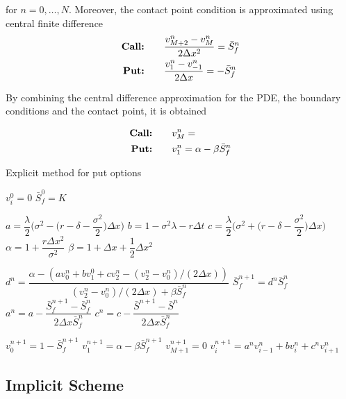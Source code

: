 for $n=0,\dots,N$. Moreover, the contact point condition is approximated using central finite difference
\begin{align*}
    \text{\textbf{Call:}} \qquad & \dfrac{v^{n}_{M+2} - v^{n}_{M}}{2\Delta{x}^2} = \bar{S}^{n}_{f} \\
    \text{\textbf{Put:}} \qquad & \dfrac{v^{n}_{1} - v^{n}_{-1}}{2\Delta{x}}  = -\bar{S}^{n}_{f}  
\end{align*}

By combining the central difference approximation for the PDE, the boundary conditions and the contact point, it is obtained 

\begin{align*}
    \text{\textbf{Call:}} \qquad & v^{n}_{M} =  \\
    \text{\textbf{Put:}} \qquad & v^{n}_{1} = \alpha - \beta\bar{S}^{n}_{f}  
\end{align*}

\begin{algorithm}[H]
    \caption{Explicit method for put options}\label{alg:appendix:companytransformation:explicits:put_explicit_method_algorithm}
    \begin{algorithmic}
      \State $v^{0}_i = 0 $
    \EndFor
    \State $\bar{S}_{f}^{0} = K$

    \State $a = \dfrac{\lambda}{2}\bigg(\sigma^2 - \bigg(r - \delta - \dfrac{\sigma^2}{2}\bigg)\Delta{x}\bigg)$
    \State $b = 1 - \sigma^2\lambda- r\Delta{t} $
    \State $c = \dfrac{\lambda}{2}\bigg(\sigma^2 + \bigg(r - \delta - \dfrac{\sigma^2}{2}\bigg)\Delta{x}\bigg)$
    \State $\alpha = 1 + \dfrac{r\Delta{x}^2}{\sigma^2}$
    \State $\beta = 1 + \Delta{x} + \dfrac{1}{2}\Delta{x}^2$

      \State $d^n = \dfrac{\alpha - (av^{n}_{0} + bv^{0}_{1} + cv^{n}_{2} - (v^{n}_{2} - v^{n}_{0})/(2\Delta{x}))}{(v^{n}_{2} - v^{n}_{0})/(2\Delta{x}) + \beta\bar{S}^{n}_f}$
      \State $\bar{S}^{n+1}_{f}=d^{n}\bar{S}^{n}_{f}$
      \State $a^{n} = a - \dfrac{\bar{S}^{n+1}_{f} - \bar{S}^{n}_{f}}{2\Delta{x}\bar{S}^{n}_{f}}$
      \State $c^{n} = c - \dfrac{\bar{S}^{n+1} - \bar{S}^{n}}{2\Delta{x}\bar{S}^{n}_{f}}$

      \State $v^{n+1}_{0}=1 - \bar{S}^{n+1}_{f}$
      \State $v^{n+1}_{1}=\alpha - \beta\bar{S}^{n+1}_{f}$
      \State $v^{n+1}_{M+1} = 0$
        \State $v^{n+1}_{i} = a^{n} v^{n}_{i-1} + b v^{n}_{i} + c^{n}v^{n}_{i+1}$
      \EndFor
    \EndFor
  \end{algorithmic}
  \end{algorithm}

\subsection{Implicit Scheme}